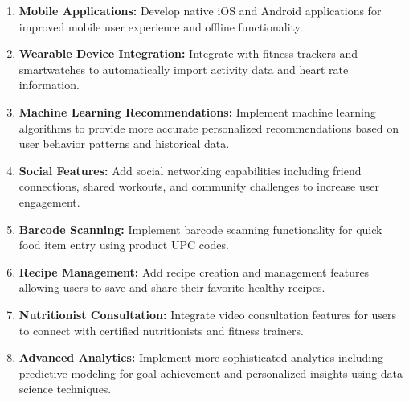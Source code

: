 \begin{enumerate}
    \item \textbf{Mobile Applications:} Develop native iOS and Android applications for improved mobile user experience and offline functionality.
    
    \item \textbf{Wearable Device Integration:} Integrate with fitness trackers and smartwatches to automatically import activity data and heart rate information.
    
    \item \textbf{Machine Learning Recommendations:} Implement machine learning algorithms to provide more accurate personalized recommendations based on user behavior patterns and historical data.
    
    \item \textbf{Social Features:} Add social networking capabilities including friend connections, shared workouts, and community challenges to increase user engagement.
    
    \item \textbf{Barcode Scanning:} Implement barcode scanning functionality for quick food item entry using product UPC codes.
    
    \item \textbf{Recipe Management:} Add recipe creation and management features allowing users to save and share their favorite healthy recipes.
    
    \item \textbf{Nutritionist Consultation:} Integrate video consultation features for users to connect with certified nutritionists and fitness trainers.
    
    \item \textbf{Advanced Analytics:} Implement more sophisticated analytics including predictive modeling for goal achievement and personalized insights using data science techniques.
\end{enumerate}
